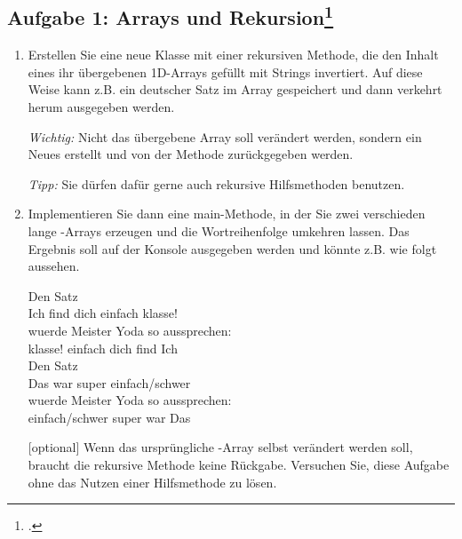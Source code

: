 \documentclass{lehramt-informatik}
\begin{document}
\begin{enumerate}
%

\section{Aufgabe 1: Arrays und Rekursion\footcite[Diese Aufgabe stammt
aus der Vorlesung Konzepte der Programmierung von Prof. Bernhard
Westfechtel der Universität Bayreuth, WS 2017/18, Übungsblatt 8 und
wurde dankenswerterweise zur Verwendung in diesem Aufgabenblatt zur
Verfügung gestellt.]{aud:ab:2}}

\begin{enumerate}

%

\item Erstellen Sie eine neue Klasse  mit einer
rekursiven Methode, die den Inhalt eines ihr übergebenen 1D-Arrays
gefüllt mit Strings invertiert. Auf diese Weise kann z.B. ein deutscher
Satz im Array gespeichert und dann verkehrt herum ausgegeben werden.

\emph{Wichtig:} Nicht das übergebene Array soll verändert werden,
sondern ein Neues erstellt und von der Methode zurückgegeben werden.

\emph{Tipp:} Sie dürfen dafür gerne auch rekursive Hilfsmethoden
benutzen.

%

\item Implementieren Sie dann eine main-Methode, in der Sie zwei
verschieden lange -Arrays erzeugen und die Wortreihenfolge
umkehren lassen. Das Ergebnis soll auf der Konsole ausgegeben werden
und könnte z.B. wie folgt aussehen.

\bigskip

{
\ttfamily
Den Satz\\
Ich find dich einfach klasse!\\
wuerde Meister Yoda so aussprechen:\\
klasse! einfach dich find Ich\\

Den Satz\\
Das war super einfach/schwer\\
wuerde Meister Yoda so aussprechen:\\
einfach/schwer super war Das
}

\bigskip

[optional] Wenn das ursprüngliche -Array selbst verändert
werden soll, braucht die rekursive Methode keine Rückgabe. Versuchen
Sie, diese Aufgabe ohne das Nutzen einer Hilfsmethode zu lösen.

\begin{antwort}
\end{antwort}
\end{enumerate}
\end{enumerate}
\end{document}
